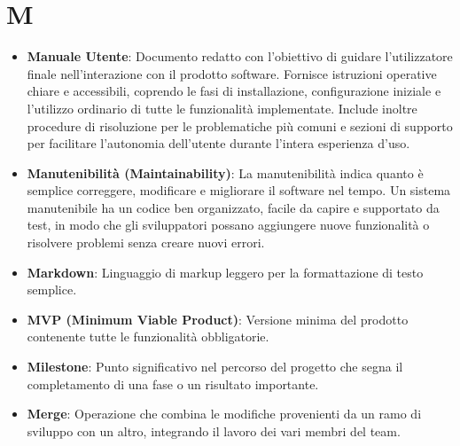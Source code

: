 \documentclass[11pt,a4paper]{article}
\begin{document}
\section*{M}
\begin{itemize}
\item \textbf{Manuale Utente}: Documento redatto con l'obiettivo di 
guidare l'utilizzatore finale nell'interazione con il prodotto software. Fornisce istruzioni operative chiare e accessibili, coprendo le fasi di installazione, configurazione iniziale e l'utilizzo ordinario di tutte le funzionalità implementate. Include inoltre procedure di risoluzione per le problematiche più comuni e sezioni di supporto per facilitare l'autonomia 
dell'utente durante l'intera esperienza d'uso.

\item \textbf{Manutenibilità (Maintainability)}: La manutenibilità indica quanto è semplice correggere, modificare e migliorare il software nel tempo. Un sistema manutenibile ha un codice ben organizzato, facile da capire e supportato da test, in modo che gli sviluppatori possano aggiungere nuove funzionalità o risolvere problemi senza creare nuovi errori.

\item \textbf{Markdown}: Linguaggio di markup leggero per la formattazione di testo semplice.

\item \textbf{MVP (Minimum Viable Product)}: Versione minima del prodotto contenente tutte le funzionalità obbligatorie.

\item \textbf{Milestone}: Punto significativo nel percorso del progetto che segna il completamento di una fase o un risultato importante.

\item \textbf{Merge}: Operazione che combina le modifiche provenienti da un ramo di sviluppo con un altro, integrando il lavoro dei vari membri del team.

\end{itemize}
\newpage
\end{document}
